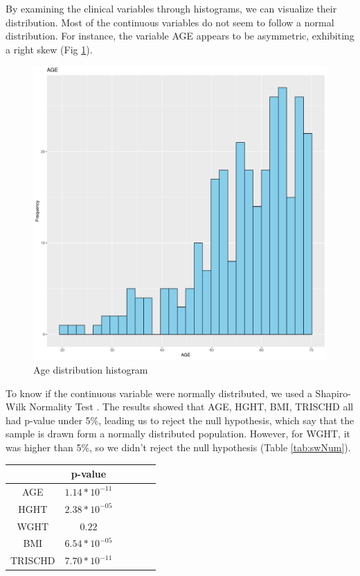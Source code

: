 \documentclass[a4paper, 11pt]{article}
\begin{document}
\begin{multicols}{2}
By examining the clinical variables through histograms, we can visualize their distribution. 
Most of the continuous variables do not seem to follow a normal distribution. 
For instance, the variable AGE appears to be asymmetric, exhibiting a right skew (Fig \ref{fig:ageDistrib}).
\begin{figure}[H]
	\centering
	\includegraphics[width=\columnwidth]{figures/clinical_data_var_dist/AGE}
	\caption{Age distribution histogram }
	\label{fig:ageDistrib}
\end{figure}
To know if the continuous variable were normally distributed, we used a Shapiro-Wilk Normality Test \citep{R:2024}. 
The results showed that AGE, HGHT, BMI, TRISCHD all had p-value under 5\%, leading us to reject the null hypothesis, which say that the sample is drawn form a normally distributed population. 
However, for WGHT, it was higher than 5\%, so we didn’t reject the null hypothesis (Table \ref{tab:swNum}). 
\begin{table}[H]
\begin{center}
	\setlength{\tabcolsep}{0.5pt}
	\begin{tabular}{ |c|c|c|c|c|c| } 
	\hline 
	& p-value   \\[0.2cm] 
	\hline
	 AGE &\small $1.14*10^{-11} $   \\ [0.1cm]
	\hline
	 HGHT &\small $2.38*10^{-05} $  \\[0.1cm]
	\hline
	 WGHT & \small $ 0.22 $  \\[0.1cm]
	\hline
	 BMI &   \small $6.54*10^{-05}  $ \\[0.1cm]
	\hline
	 TRISCHD &\small $7.70*10^{-11}$ \\[0.1cm]
	\hline
	 

\end{tabular}
\end{center}
\end{table}
\end{multicols}
\end{document}
